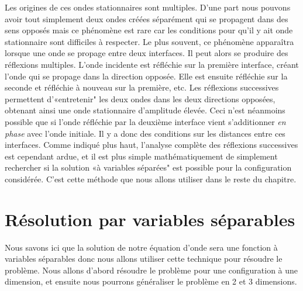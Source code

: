 Les origines de ces ondes stationnaires sont multiples. D'une part nous pouvons avoir tout simplement deux ondes créées séparément qui se propagent dans des sens opposés mais ce phénomène est rare car les conditions pour qu'il y ait onde stationnaire sont difficiles à respecter. Le plus souvent, ce phénomène apparaîtra lorsque une onde se propage entre deux interfaces. Il peut alors se produire des réflexions multiples. L'onde incidente est réfléchie sur la première interface, créant l'onde qui se propage dans la direction opposée. Elle est ensuite  réfléchie sur la seconde et réfléchie à nouveau sur la première, etc. Les réflexions successives permettent d'«entretenir" les deux ondes dans les deux directions opposées, obtenant ainsi une onde stationnaire d'amplitude élevée. Ceci n'est néanmoins possible que si l'onde réfléchie par la deuxième interface vient s'additionner {\it en phase} avec l'onde initiale. Il y a donc des conditions sur les distances entre ces interfaces. Comme indiqué plus haut, l'analyse complète des réflexions successives est cependant ardue, et il est plus simple mathématiquement de simplement rechercher si la solution «à variables séparées" est possible pour la configuration considérée. C'est cette méthode que nous allons utiliser dans le reste du chapitre.


\section{Résolution par variables séparables}
Nous savons ici que la solution de notre équation d'onde sera une fonction à variables séparables donc nous allons utiliser cette technique pour résoudre le problème. Nous allons d'abord résoudre le problème pour une configuration à une dimension, et ensuite nous pourrons généraliser le problème en 2 et 3 dimensions.

